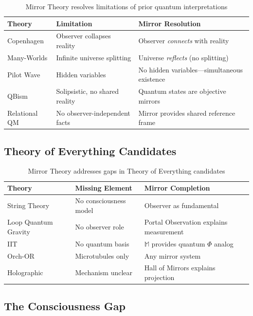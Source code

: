\documentclass[12pt,a4paper]{article}
\begin{document}
\begin{table}[h]
\centering
\begin{tabular}{p{2.5cm}p{3.5cm}p{5cm}}
\toprule
\textbf{Theory} & \textbf{Limitation} & \textbf{Mirror Resolution} \\
\midrule
Copenhagen & Observer collapses reality & Observer \textit{connects} with reality \\
Many-Worlds & Infinite universe splitting & Universe \textit{reflects} (no splitting) \\
Pilot Wave & Hidden variables & No hidden variables---simultaneous existence \\
QBism & Solipsistic, no shared reality & Quantum states are objective mirrors \\
Relational QM & No observer-independent facts & Mirror provides shared reference frame \\
\bottomrule
\end{tabular}
\caption{Mirror Theory resolves limitations of prior quantum interpretations}
\end{table}

\subsection{Theory of Everything Candidates}

\begin{table}[h]
\centering
\begin{tabular}{p{2.5cm}p{3.5cm}p{5cm}}
\toprule
\textbf{Theory} & \textbf{Missing Element} & \textbf{Mirror Completion} \\
\midrule
String Theory & No consciousness model & Observer as fundamental \\
Loop Quantum Gravity & No observer role & Portal Observation explains measurement \\
IIT & No quantum basis & $\mathbb{M}$ provides quantum $\Phi$ analog \\
Orch-OR & Microtubules only & Any mirror system \\
Holographic & Mechanism unclear & Hall of Mirrors explains projection \\
\bottomrule
\end{tabular}
\caption{Mirror Theory addresses gaps in Theory of Everything candidates}
\end{table}

\subsection{The Consciousness Gap}
\end{document}
